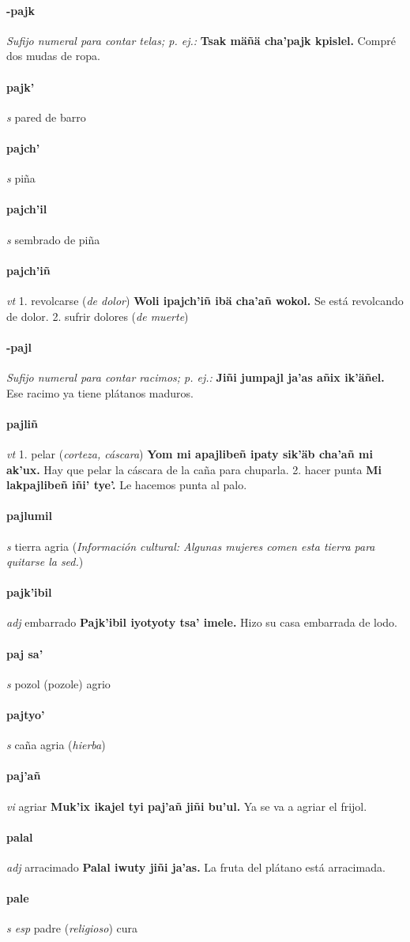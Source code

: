 \documentclass{scrbook}
\newcommand{\entry}[1]{\paragraph{#1}}
\newcommand{\onedefinition}[1]{#1.}
\newcommand{\nontranslationdef}[1]{\textit{#1}}
\newcommand{\partofspeech}[1]{\textit{#1}}
\newcommand{\spanishtranslation}[1]{#1}
\newcommand{\clarification}[1]{(\textit{#1})}
\newcommand{\cholexample}[1]{\textbf{#1}}
\newcommand{\exampletranslation}[1]{#1}
\newcommand{\culturalinformation}[1]{(\textit{#1})}
\begin{document}
\begin{multicols}{2}
\entry{-pajk}
\nontranslationdef{Sufijo numeral para contar telas; p. ej.:}
\cholexample{Tsak mäñä cha'pajk kpislel.}
\exampletranslation{Compré dos mudas de ropa.}

\entry{pajk'}
\partofspeech{s}
\spanishtranslation{pared de barro}

\entry{pajch'}
\partofspeech{s}
\spanishtranslation{piña}

\entry{pajch'il}
\partofspeech{s}
\spanishtranslation{sembrado de piña}

\entry{pajch'iñ}
\partofspeech{vt}
\onedefinition{1}
\spanishtranslation{revolcarse}
\clarification{de dolor}
\cholexample{Woli ipajch'iñ ibä cha'añ wokol.}
\exampletranslation{Se está revolcando de dolor.}
\onedefinition{2}
\spanishtranslation{sufrir dolores}
\clarification{de muerte}

\entry{-pajl}
\nontranslationdef{Sufijo numeral para contar racimos; p. ej.:}
\cholexample{Jiñi jumpajl ja'as añix ik'äñel.}
\exampletranslation{Ese racimo ya tiene plátanos maduros.}

\entry{pajliñ}
\partofspeech{vt}
\onedefinition{1}
\spanishtranslation{pelar}
\clarification{corteza, cáscara}
\cholexample{Yom mi apajlibeñ ipaty sik'äb cha'añ mi ak'ux.}
\exampletranslation{Hay que pelar la cáscara de la caña para chuparla.}
\onedefinition{2}
\spanishtranslation{hacer punta}
\cholexample{Mi lakpajlibeñ iñi' tye'.}
\exampletranslation{Le hacemos punta al palo.}

\entry{pajlumil}
\partofspeech{s}
\spanishtranslation{tierra agria}
\culturalinformation{Información cultural: Algunas mujeres comen esta tierra para quitarse la sed.}

\entry{pajk'ibil}
\partofspeech{adj}
\spanishtranslation{embarrado}
\cholexample{Pajk'ibil iyotyoty tsa' imele.}
\exampletranslation{Hizo su casa embarrada de lodo.}

\entry{paj sa'}
\partofspeech{s}
\spanishtranslation{pozol (pozole) agrio}

\entry{pajtyo'}
\partofspeech{s}
\spanishtranslation{caña agria}
\clarification{hierba}

\entry{paj'añ}
\partofspeech{vi}
\spanishtranslation{agriar}
\cholexample{Muk'ix ikajel tyi paj'añ jiñi bu'ul.}
\exampletranslation{Ya se va a agriar el frijol.}

\entry{palal}
\partofspeech{adj}
\spanishtranslation{arracimado}
\cholexample{Palal iwuty jiñi ja'as.}
\exampletranslation{La fruta del plátano está arracimada.}

\entry{pale}
\partofspeech{s esp}
\spanishtranslation{padre}
\clarification{religioso}
\spanishtranslation{cura}


\end{multicols}
\end{document}
